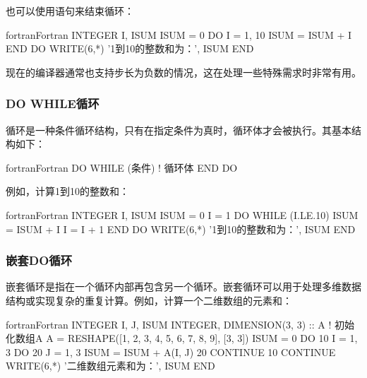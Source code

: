 也可以使用语句来结束循环：
\begin{envcode}{fortran}{Fortran}
      INTEGER I, ISUM
      ISUM = 0
      DO I = 1, 10
          ISUM = ISUM + I
      END DO
      WRITE(6,*) '1到10的整数和为：', ISUM
      END
\end{envcode}

现在的编译器通常也支持步长为负数的情况，这在处理一些特殊需求时非常有用。

\subsubsection{DO WHILE循环}
循环是一种条件循环结构，只有在指定条件为真时，循环体才会被执行。其基本结构如下：
\begin{envcode}{fortran}{Fortran}
      DO WHILE (条件)
          ! 循环体
      END DO
\end{envcode}
例如，计算1到10的整数和：
\begin{envcode}{fortran}{Fortran}
      INTEGER I, ISUM
      ISUM = 0
      I = 1
      DO WHILE (I.LE.10)
          ISUM = ISUM + I
          I = I + 1
      END DO
      WRITE(6,*) '1到10的整数和为：', ISUM
      END
\end{envcode}

\subsubsection{嵌套DO循环}
嵌套循环是指在一个循环内部再包含另一个循环。嵌套循环可以用于处理多维数据结构或实现复杂的重复计算。例如，计算一个二维数组的元素和：
\begin{envcode}{fortran}{Fortran}
      INTEGER I, J, ISUM
      INTEGER, DIMENSION(3, 3) :: A
      ! 初始化数组A
      A = RESHAPE([1, 2, 3, 4, 5, 6, 7, 8, 9], [3, 3])
      ISUM = 0
      DO 10 I = 1, 3
          DO 20 J = 1, 3
              ISUM = ISUM + A(I, J)
20        CONTINUE
10    CONTINUE
      WRITE(6,*) '二维数组元素和为：', ISUM
      END
\end{envcode}

